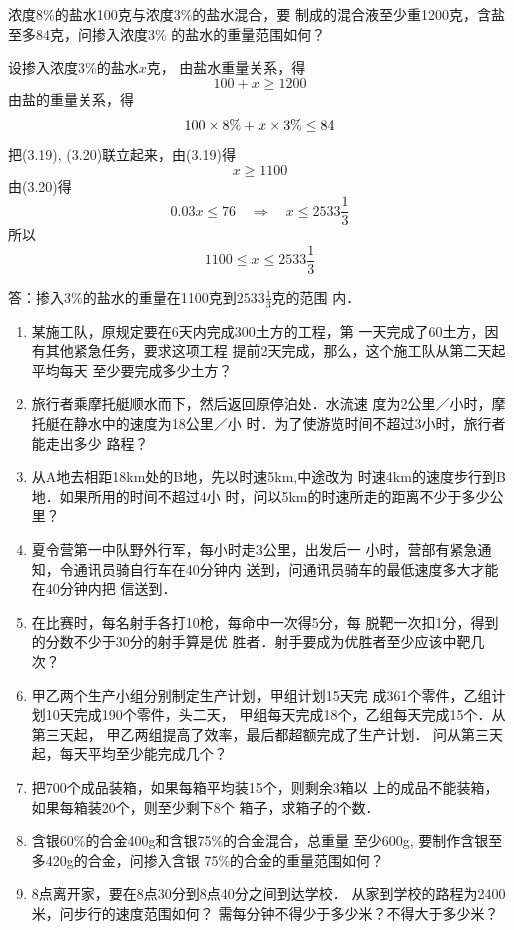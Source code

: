 \begin{example}
浓度8\%的盐水100克与浓度3\%的盐水混合，要
制成的混合液至少重1200克，含盐至多84克，问掺入浓度3\%
的盐水的重量范围如何？
\end{example}


\begin{solution}
设掺入浓度3\%的盐水$x$克，
由盐水重量关系，得
\begin{equation}
    100+x\ge 1200
\end{equation}
由盐的重量关系，得
\begin{equation}
    100\times8\%+x \times 3\%\le 84
\end{equation}
把(3.19), (3.20)联立起来，由(3.19)得
\[x\ge 1100\]
由(3.20)得
\[0.03x\le 76\quad \Rightarrow\quad 
x\le 2533\frac{1}{3}\]
所以
\[1100\le x\le 2533\frac{1}{3}\]

答：掺入3\%的盐水的重量在1100克到$2533\frac{1}{3}$克的范围
内．
\end{solution}


\begin{ex}
\begin{enumerate}
    \item 某施工队，原规定要在6天内完成300土方的工程，第
    一天完成了60土方，因有其他紧急任务，要求这项工程
    提前2天完成，那么，这个施工队从第二天起平均每天
    至少要完成多少土方？
    \item 旅行者乘摩托艇顺水而下，然后返回原停泊处．水流速
    度为2公里／小时，摩托艇在静水中的速度为18公里／小
    时．为了使游览时间不超过3小时，旅行者能走出多少
    路程？
    \item 从A地去相距18km处的B地，先以时速5km,中途改为
    时速4km的速度步行到B地．如果所用的时间不超过4小
    时，问以5km的时速所走的距离不少于多少公里？
    \item 夏令营第一中队野外行军，每小时走3公里，出发后一
    小时，营部有紧急通知，令通讯员骑自行车在40分钟内
    送到，问通讯员骑车的最低速度多大才能在40分钟内把
    信送到．
    \item 在比赛时，每名射手各打10枪，每命中一次得5分，每
    脱靶一次扣1分，得到的分数不少于30分的射手算是优
    胜者．射手要成为优胜者至少应该中靶几次？
    \item 
    甲乙两个生产小组分别制定生产计划，甲组计划15天完
    成361个零件，乙组计划10天完成190个零件，头二天，
    甲组每天完成18个，乙组每天完成15个．从第三天起，
    甲乙两组提高了效率，最后都超额完成了生产计划．
    问从第三天起，每天平均至少能完成几个？
    \item 把700个成品装箱，如果每箱平均装15个，则剩余3箱以
上的成品不能装箱，如果每箱装20个，则至少剩下8个
箱子，求箱子的个数．
\item 
含银60\%的合金400g和含银75\%的合金混合，总重量
至少600g, 要制作含银至多420g的合金，问掺入含银
75\%的合金的重量范围如何？
\item 
8点离开家，要在8点30分到8点40分之间到达学校．
从家到学校的路程为2400米，问步行的速度范围如何？
需每分钟不得少于多少米？不得大于多少米？
\end{enumerate}
\end{ex}

